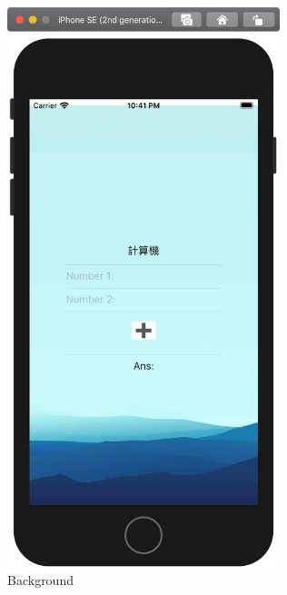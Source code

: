 \documentclass[a4paper,12pt]{article}
\begin{document}
\begin{figure}[htbp]
\centering
\includegraphics[width=300]{images/background-1.jpg}
\caption{\label{fig:Background-1}Background}
\end{figure}
\end{document}
